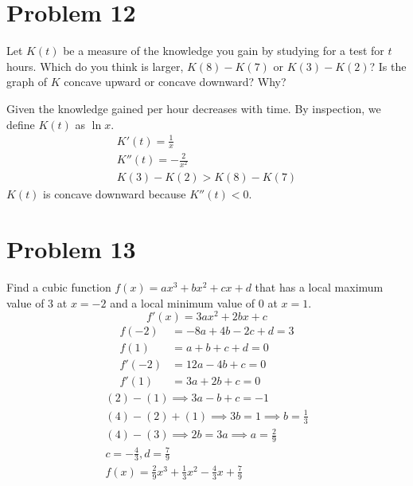 \documentclass[12pt]{article}
\newcommand{\vem}{\vspace{0.5em}}
\newcommand{\problem}[1]{\section{Problem #1}}
\begin{document}
\problem{12}
Let $K(t)$ be a measure of the knowledge you gain by studying for a test for $t$ hours. Which do you think is larger, $K(8) - K(7)$ or $K(3) - K(2)$? Is the graph of $K$ concave upward or concave downward? Why?
\vem

Given the knowledge gained per hour decreases with time. By inspection, we define $K(t)$ as $\ln x$.
\begin{gather*}
    K'(t)=\frac{1}{x}\\
    K''(t)=-\frac{2}{x^2}\\
    \boxed{K(3)-K(2)>K(8)-K(7)}
\end{gather*}
$K(t)$ is concave downward because $K''(t)<0$. \vem

\problem{13}
Find a cubic function $f(x) = ax^3 + bx^2 + cx + d$ that has a local maximum value of $3$ at $x = -2$ and a local minimum value of $0$ at $x = 1$.
\[
f'(x)=3ax^2+2bx+c
\] 
\vspace{-2.5em}
\begin{align}
    f(-2)&=-8a+4b-2c+d=3\\
    f(1)&=a+b+c+d=0\\
    f'(-2)&=12a-4b+c=0\\
    f'(1)&=3a+2b+c=0
\end{align}
 \vspace{-2.5em}
\begin{gather*}
    (2)-(1) \implies 3a-b+c=-1\\
    (4)-(2)+(1) \implies 3b=1 \implies b=\frac{1}{3}\\
    (4)-(3) \implies 2b=3a \implies a=\frac{2}{9}\\
    c=-\frac{4}{3},d=\frac{7}{9}\\
    \boxed{f(x)=\frac{2}{9}x^3+\frac{1}{3}x^2-\frac{4}{3}x+\frac{7}{9}}
\end{gather*}
\end{document}
